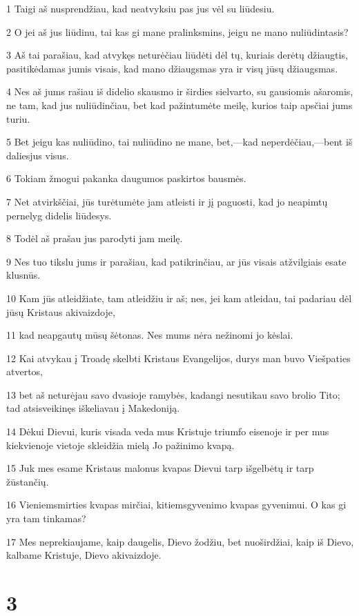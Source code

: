 \par 1 Taigi aš nusprendžiau, kad neatvyksiu pas jus vėl su liūdesiu. 
\par 2 O jei aš jus liūdinu, tai kas gi mane pralinksmins, jeigu ne mano nuliūdintasis? 
\par 3 Aš tai parašiau, kad atvykęs neturėčiau liūdėti dėl tų, kuriais derėtų džiaugtis, pasitikėdamas jumis visais, kad mano džiaugsmas yra ir visų jūsų džiaugsmas. 
\par 4 Nes aš jums rašiau iš didelio skausmo ir širdies sielvarto, su gausiomis ašaromis, ne tam, kad jus nuliūdinčiau, bet kad pažintumėte meilę, kurios taip apsčiai jums turiu. 
\par 5 Bet jeigu kas nuliūdino, tai nuliūdino ne mane, bet,—kad neperdėčiau,—bent iš dalies­jus visus. 
\par 6 Tokiam žmogui pakanka daugumos paskirtos bausmės. 
\par 7 Net atvirkščiai, jūs turėtumėte jam atleisti ir jį paguosti, kad jo neapimtų pernelyg didelis liūdesys. 
\par 8 Todėl aš prašau jus parodyti jam meilę. 
\par 9 Nes tuo tikslu jums ir parašiau,­ kad patikrinčiau, ar jūs visais atžvilgiais esate klusnūs. 
\par 10 Kam jūs atleidžiate, tam atleidžiu ir aš; nes, jei kam atleidau, tai padariau dėl jūsų Kristaus akivaizdoje, 
\par 11 kad neapgautų mūsų šėtonas. Nes mums nėra nežinomi jo kėslai. 
\par 12 Kai atvykau į Troadę skelbti Kristaus Evangelijos, durys man buvo Viešpaties atvertos, 
\par 13 bet aš neturėjau savo dvasioje ramybės, kadangi nesutikau savo brolio Tito; tad atsisveikinęs iškeliavau į Makedoniją. 
\par 14 Dėkui Dievui, kuris visada veda mus Kristuje triumfo eisenoje ir per mus kiekvienoje vietoje skleidžia mielą Jo pažinimo kvapą. 
\par 15 Juk mes esame Kristaus malonus kvapas Dievui tarp išgelbėtų ir tarp žūstančių. 
\par 16 Vieniems­mirties kvapas mirčiai, kitiems­gyvenimo kvapas gyvenimui. O kas gi yra tam tinkamas? 
\par 17 Mes neprekiaujame, kaip daugelis, Dievo žodžiu, bet nuoširdžiai, kaip iš Dievo, kalbame Kristuje, Dievo akivaizdoje.


\chapter{3}


